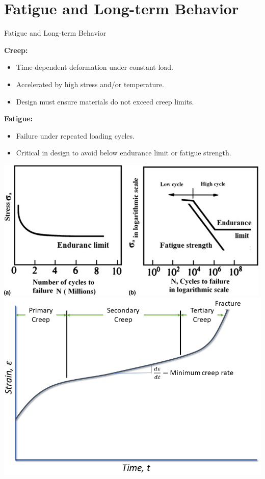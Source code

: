 \documentclass{beamer}
\begin{document}
\section{Fatigue and Long-term Behavior}
\begin{frame}{Fatigue and Long-term Behavior}
    \begin{minipage}[t]{0.5\textwidth}
        \fontsize{8}{10}\selectfont
        \textbf{Creep:}
        \begin{itemize}
            \item Time-dependent deformation under constant load.
            \item Accelerated by high stress and/or temperature.
            \item Design must ensure materials do not exceed creep limits.
        \end{itemize}
        \vspace{0.2cm}
        \textbf{Fatigue:}
        \begin{itemize}
            \item Failure under repeated loading cycles.
            \item Critical in design to avoid below endurance limit or fatigue strength.
        \end{itemize}
    \end{minipage}
    \hfill
    \begin{minipage}[t]{0.45\textwidth}
        \vspace{0pt}
        \includegraphics[width=\textwidth]{Fatigue.jpg}
        \includegraphics[width=\textwidth]{Creep2.png}
    \end{minipage}
\end{frame}
\end{document}
